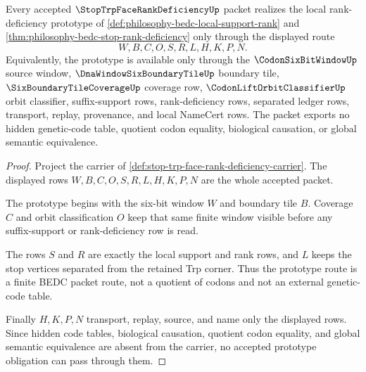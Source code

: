 \begin{theorem}
\label{thm:rank-deficiency-prototype-obligation-surface}
Every accepted $\StopTrpFaceRankDeficiencyUp$ packet realizes the local
rank-deficiency prototype of \autoref{def:philosophy-bedc-local-support-rank}
and \autoref{thm:philosophy-bedc-stop-rank-deficiency} only through the
displayed route
$$
W,B,C,O,S,R,L,H,K,P,N .
$$
Equivalently, the prototype is available only through the
$\CodonSixBitWindowUp$ source window, $\DnaWindowSixBoundaryTileUp$ boundary
tile, $\SixBoundaryTileCoverageUp$ coverage row,
$\CodonLiftOrbitClassifierUp$ orbit classifier, suffix-support rows,
rank-deficiency rows, separated ledger rows, transport, replay, provenance,
and local NameCert rows. The packet exports no hidden genetic-code table,
quotient codon equality, biological causation, or global semantic
equivalence.
\end{theorem}
\begin{proof}
Project the carrier of
\autoref{def:stop-trp-face-rank-deficiency-carrier}. The displayed rows
$W,B,C,O,S,R,L,H,K,P,N$ are the whole accepted packet.

The prototype begins with the six-bit window $W$ and boundary tile $B$.
Coverage $C$ and orbit classification $O$ keep that same finite window visible
before any suffix-support or rank-deficiency row is read.

The rows $S$ and $R$ are exactly the local support and rank rows, and $L$
keeps the stop vertices separated from the retained Trp corner. Thus the
prototype route is a finite BEDC packet route, not a quotient of codons and not
an external genetic-code table.

Finally $H,K,P,N$ transport, replay, source, and name only the displayed
rows. Since hidden code tables, biological causation, quotient codon equality,
and global semantic equivalence are absent from the carrier, no accepted
prototype obligation can pass through them.
\end{proof}

